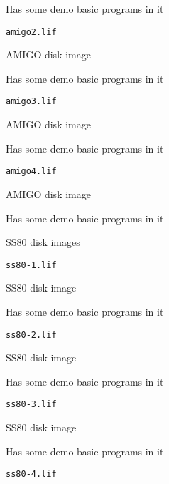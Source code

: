 \begin{DoxyItemize}
\begin{DoxyItemize}
\begin{DoxyItemize}
\begin{DoxyItemize}
\begin{DoxyItemize}
\item Has some demo basic programs in it
\end{DoxyItemize}
\item \href{sdcard/amigo2.lif}{\tt amigo2.\+lif}
\begin{DoxyItemize}
\item A\+M\+I\+GO disk image
\item Has some demo basic programs in it
\end{DoxyItemize}
\item \href{sdcard/amigo3.lif}{\tt amigo3.\+lif}
\begin{DoxyItemize}
\item A\+M\+I\+GO disk image
\item Has some demo basic programs in it
\end{DoxyItemize}
\item \href{sdcard/amigo4.lif}{\tt amigo4.\+lif}
\begin{DoxyItemize}
\item A\+M\+I\+GO disk image
\item Has some demo basic programs in it
\end{DoxyItemize}
\end{DoxyItemize}
\item S\+S80 disk images
\begin{DoxyItemize}
\item \href{sdcard/ss80-1.lif}{\tt ss80-\/1.\+lif}
\begin{DoxyItemize}
\item S\+S80 disk image
\item Has some demo basic programs in it
\end{DoxyItemize}
\item \href{sdcard/ss80-2.lif}{\tt ss80-\/2.\+lif}
\begin{DoxyItemize}
\item S\+S80 disk image
\item Has some demo basic programs in it
\end{DoxyItemize}
\item \href{sdcard/ss80-3.lif}{\tt ss80-\/3.\+lif}
\begin{DoxyItemize}
\item S\+S80 disk image
\item Has some demo basic programs in it
\end{DoxyItemize}
\item \href{sdcard/ss80-4.lif}{\tt ss80-\/4.\+lif}
\begin{DoxyItemize}

\end{DoxyItemize}
\end{DoxyItemize}
\end{DoxyItemize}
\end{DoxyItemize}
\end{DoxyItemize}
